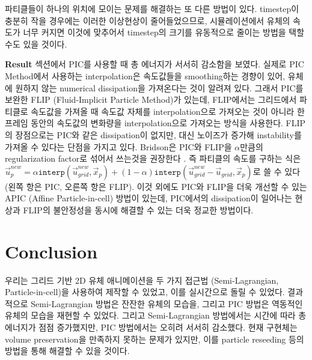 \documentclass[12pt, A4]{article}
\begin{document}
파티클들이 하나의 위치에 모이는 문제를 해결하는 또 다른 방법이 있다. timestep이 충분히 작을 경우에는 이러한 이상현상이 줄어들었으므로, 시뮬레이션에서 유체의 속도가 너무 커지면 이것에 맞추어서 timestep의 크기를 유동적으로 줄이는 방법을 택할 수도 있을 것이다.

\textbf{Result} 섹션에서 PIC를 사용할 때 총 에너지가 서서히 감소함을 보였다. 실제로 PIC Method에서 사용하는 interpolation은 속도값들을 smoothing하는 경향이 있어, 유체에 원하지 않는 numerical dissipation을 가져온다는 것이 알려져 있다. 그래서 PIC를 보완한 FLIP (Fluid-Implicit Particle Method)가 있는데, FLIP에서는 그리드에서 파티클로 속도값을 가져올 때 속도값 자체를 interpolation으로 가져오는 것이 아니라 한 프레임 동안의 속도값의 변화량을 interpolation으로 가져오는 방식을 사용한다. FLIP의 장점으로는 PIC와 같은 dissipation이 없지만, 대신 노이즈가 증가해 instability를 가져올 수 있다는 단점을 가지고 있다. Bridson은 PIC와 FLIP을 $\alpha$만큼의 regularization factor로 섞어서 쓰는것을 권장한다 \cite[p. 118]{fluid-sim-cg}. 즉 파티클의 속도를 구하는 식은 $\vec{u}_p^{new} = \alpha \texttt{interp}(\vec{u}_{grid}^{new}, \vec{x}_p) + (1 - \alpha) \texttt{interp}(\vec{u}_{grid}^{new} - \vec{u}_{grid}, \vec{x}_p)$로 쓸 수 있다 (왼쪽 항은 PIC, 오른쪽 항은 FLIP). 이것 외에도 PIC와 FLIP을 더욱 개선할 수 있는 APIC (Affine Particle-in-cell) 방법이 있는데, PIC에서의 dissipation이 일어나는 현상과 FLIP의 불안정성을 동시에 해결할 수 있는 더욱 정교한 방법이다. \cite{apic}

\section{Conclusion}

우리는 그리드 기반 2D 유체 애니메이션을 두 가지 접근법 (Semi-Lagrangian, Particle-in-cell)을 사용하여 제작할 수 있었고, 이를 실시간으로 돌릴 수 있었다. 결과적으로 Semi-Lagrangian 방법은 잔잔한 유체의 모습을, 그리고 PIC 방법은 역동적인 유체의 모습을 재현할 수 있었다. 그리고 Semi-Lagrangian 방법에서는 시간에 따라 총 에너지가 점점 증가했지만, PIC 방법에서는 오히려 서서히 감소했다. 현재 구현체는 volume preservation을 만족하지 못하는 문제가 있지만, 이를 particle reseeding 등의 방법을 통해 해결할 수 있을 것이다.

\newpage 
\end{document}
